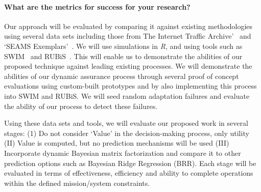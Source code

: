 \documentclass[12pt]{article}
\begin{document}
\vspace{-5mm}\paragraph{What are the metrics for success for your research? }Our approach will be evaluated by comparing it against existing methodologies using several data sets including those from The Internet Traffic Archive'~\cite{InternetTrafficArchive_URL} and `SEAMS Exemplars'~\cite{SEAMS_Exemplars_URL}. We will use simulations in \emph{R}, and using tools such as SWIM~\cite{moreno2018swim} and RUBiS~\cite{Rubis_URL}. This will enable us to demonstrate the abilities of our proposed technique against leading existing processes. We will demonstrate the abilities of our dynamic assurance process through several proof of concept evaluations using custom-built prototypes and by also implementing this process into SWIM and RUBiS. We will seed random adaptation failures and evaluate the ability of our process to detect these failures.

Using these data sets and tools, we will evaluate our proposed work in several stages: (1) Do not consider `Value' in the decision-making process, only utility (II) Value is computed, but no prediction mechanisms will be used (III) Incorporate dynamic Bayesian matrix factorization and compare it to other prediction options such as Bayesian Ridge Regression (BRR). Each stage will be evaluated in terms of effectiveness, efficiency and ability to complete operations within the defined mission/system constraints.




    
\end{document}
